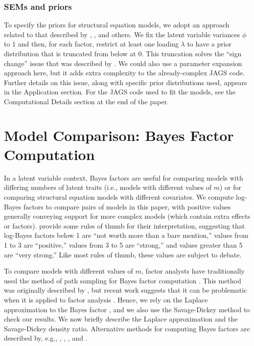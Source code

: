 \subsubsection{SEMs and priors}
To specify the priors for structural equation models, we adopt an approach related to that described by , , and others.  We fix the latent variable variances $\phi$ to 1 and then, for each factor, restrict at least one loading $\lambda$ to have a prior distribution that is truncated from below at 0.  This truncation solves the ``sign change'' issue that was described by .  We could also use a parameter expansion approach here, but it adds extra complexity to the already-complex JAGS code.  Further details on this issue, along with specific prior distributions used, appears in the Application section.  For the JAGS code used to fit the models, see the Computational Details section at the end of the paper.


\section{Model Comparison: Bayes Factor Computation}

In a latent variable context, Bayes factors are useful for comparing models with differing numbers of latent traits (i.e., models with different values of $m$) or for comparing structural equation models with different covariates.  We compute log-Bayes factors to compare pairs of models in this paper, with positive values generally conveying support for more complex models (which contain extra effects or factors).   provide some rules of thumb for their interpretation, suggesting that log-Bayes factors below 1 are ``not worth more than a bare mention,'' values from 1 to 3 are ``positive,'' values from 3 to 5 are ``strong,'' and values greater than 5 are ``very strong.''   Like most rules of thumb, these values are subject to debate.

To compare models with different values of $m$, factor analysts have traditionally used the method of path sampling for Bayes factor computation \cite{leeson02,ghodun09}.  This method was originally described by , but recent work suggests that it can be problematic when it is applied to factor analysis \cite{dutgho13}.  Hence, we rely on the Laplace approximation to the Bayes factor \cite{kasraf95,lewraf97}, and we also use the Savage-Dickey method \cite{diclie70,wag10} to check our results.  We now briefly describe the Laplace approximation and the Savage-Dickey density ratio.  Alternative methods for computing Bayes factors are described by, e.g., , , , and .

